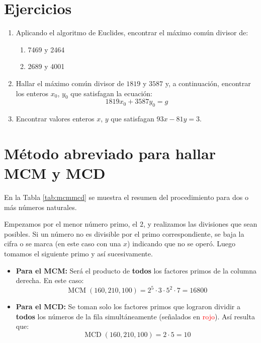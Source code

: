 \begin{enumerate}
\section*{Ejercicios}
\begin{enumerate}
    \item Aplicando el algoritmo de Euclides, encontrar el máximo común divisor de:
    \begin{enumerate}
        \item 7469 y 2464
        \item 2689 y 4001
    \end{enumerate}
    
    \item Hallar el máximo común divisor de $1819$ y $3587$ y, a continuación, encontrar los enteros $x_0$, $y_0$ que satisfagan la ecuación:
    \[ 1819x_0 + 3587y_0 = g \]
    
    \item Encontrar valores enteros $x$, $y$ que satisfagan $93x - 81y = 3$.
\end{enumerate}

\section*{Método abreviado para hallar MCM y MCD}
En la Tabla \ref{tab:mcmmcd} se muestra el resumen del procedimiento para dos o más números naturales. 

Empezamos por el menor número primo, el $2$, y realizamos las divisiones que sean posibles. Si un número no es divisible por el primo correspondiente, se baja la cifra o se marca (en este caso con una $x$) indicando que no se operó. Luego tomamos el siguiente primo y así sucesivamente.

\begin{itemize}
    \item \textbf{Para el MCM:} Será el producto de \textbf{todos} los factores primos de la columna derecha. En este caso:
    \[ \operatorname{MCM}(160,210,100) = 2^5 \cdot 3 \cdot 5^2 \cdot 7 = 16800 \]
    \item \textbf{Para el MCD:} Se toman solo los factores primos que lograron dividir a \textbf{todos} los números de la fila simultáneamente (señalados en \textcolor{red}{rojo}). Así resulta que:
    \[ \operatorname{MCD}(160,210,100) = 2 \cdot 5 = 10 \]
\end{itemize}


\end{enumerate}
